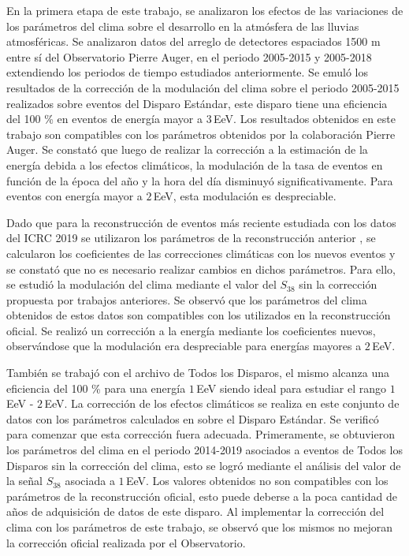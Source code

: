 
En la primera etapa de este trabajo, se analizaron los efectos de las variaciones de los parámetros del clima sobre el desarrollo en la atmósfera de las lluvias atmosféricas. Se analizaron datos del arreglo de detectores espaciados 1500 m entre sí del Observatorio Pierre Auger, en el periodo 2005-2015 y 2005-2018 extendiendo los periodos de tiempo estudiados anteriormente. Se emuló los resultados de la corrección de la modulación del clima sobre el periodo 2005-2015 realizados sobre eventos del Disparo Estándar, este disparo tiene una eficiencia del 100 \% en eventos de energía mayor a $3\,$EeV. Los resultados obtenidos en este trabajo son compatibles con los parámetros obtenidos por la colaboración Pierre Auger. Se constató que luego de realizar la corrección a la estimación de la energía debida a los efectos climáticos, la modulación de la tasa de eventos en función de la época del año y la hora del día disminuyó significativamente. Para eventos con energía mayor a $2\,$EeV, esta modulación es despreciable.

Dado que para la reconstrucción de eventos más reciente estudiada con los datos del ICRC 2019 se utilizaron los parámetros de la reconstrucción anterior \cite{aab2017impact}, se calcularon los coeficientes de las correcciones climáticas con los nuevos eventos y se constató que no es necesario realizar cambios en dichos parámetros.  Para ello, se estudió la modulación del clima mediante el valor del $S_{38}$ sin la corrección propuesta por trabajos anteriores. Se observó que los parámetros del clima obtenidos de estos datos son compatibles con los utilizados en la reconstrucción oficial. Se realizó un corrección a la energía mediante los coeficientes nuevos, observándose que la modulación era despreciable para energías mayores a $2\,$EeV. 

También se trabajó con el archivo de Todos los Disparos, el mismo alcanza una eficiencia del 100 \% para una energía $1\,$EeV siendo ideal para estudiar el rango $1\,$EeV - $2\,$EeV. La corrección de los efectos climáticos se realiza en este conjunto de datos con los parámetros calculados en \cite{aab2017impact} sobre el Disparo Estándar. Se verificó para comenzar que esta corrección fuera adecuada. Primeramente, se obtuvieron los parámetros del clima en el periodo 2014-2019 asociados a eventos de Todos los Disparos sin la corrección del clima, esto se logró mediante el análisis del valor de la señal $S_{38}$ asociada a $1\,$EeV. Los valores obtenidos no son compatibles con los parámetros de la reconstrucción oficial, esto puede deberse  a la poca cantidad de años de adquisición de datos de este disparo. Al implementar la corrección del clima con los parámetros de este trabajo, se observó que los mismos no mejoran la corrección oficial realizada por el Observatorio.

